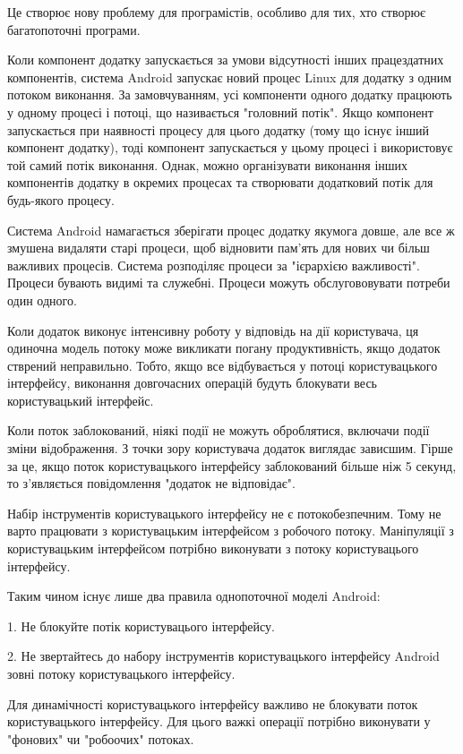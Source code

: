 Це створює нову проблему для програмістів, особливо для тих, хто створює багатопоточні програми. \cite{carver2005modern}

Коли компонент додатку запускається за умови відсутності інших працездатних компонентів, система Android запускає новий процес Linux для додатку з одним потоком виконання. За замовчуванням, усі компоненти одного додатку працюють у одному процесі і потоці, що називається "головний потік". Якщо компонент запускається при наявності процесу для цього додатку (тому що існує інший компонент додатку), тоді компонент запускається у цьому процесі і використовує той самий потік виконання. Однак, можно організувати виконання інших компонентів додатку в окремих процесах та створювати додатковий потік для будь-якого процесу.

Система Android намагається зберігати процес додатку якумога довше, але все ж змушена видаляти старі процеси, щоб відновити пам'ять для нових чи більш важливих процесів. Система розподіляє процеси за "ієрархією важливості". Процеси бувають видимі та служебні. Процеси можуть обслугововувати потреби один одного.

Коли додаток виконує інтенсивну роботу у відповідь на дії користувача, ця одиночна модель потоку може викликати погану продуктивність, якщо додаток стврений неправильно. Тобто, якщо все відбувається у потоці користувацького інтерфейсу, виконання довгочасних операцій будуть блокувати весь користувацький інтерфейс.

Коли поток заблокований, ніякі події не можуть оброблятися, включачи події зміни відображення. З точки зору користувача додаток виглядає зависшим. Гірше за це, якщо поток користувацького інтерфейсу заблокований більше ніж 5 секунд, то з'являється повідомлення "додаток не відповідає".

Набір інструментів користувацького інтерфейсу не є потокобезпечним. Тому не варто працювати з користувацьким інтерфейсом з робочого потоку. Маніпуляції з користувацьким інтерфейсом потрібно виконувати з потоку користувацього інтерфейсу. 

Таким чином існує лише два правила однопоточної моделі Android:

1. Не блокуйте потік користувацього інтерфейсу.

2. Не звертайтесь до набору інструментів користувацького інтерфейсу Android зовні потоку користувацького інтерфейсу.

Для динамічності користувацького інтерфейсу важливо не блокувати поток користувацького інтерфейсу. Для цього важкі операції потрібно виконувати у "фонових" чи  "робоочих" потоках.

